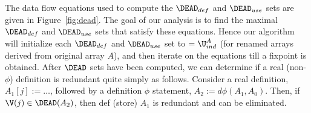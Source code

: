 The data flow equations used to compute the $\DEAD_{def}$ and $\DEAD_{use}$ sets are given in Figure~\ref{fig:dead}.
The goal of our analysis is to find the maximal $\DEAD_{def}$ and $\DEAD_{use}$ sets that satisfy these
equations.  Hence our algorithm will initialize each 
$\DEAD_{def}$ and $\DEAD_{use}$
set to
$= \U^A_{ind}$
(for renamed arrays derived from original array $A$),
and then iterate on the equations till a fixpoint
is obtained.
After $\DEAD$ sets have been computed, we can determine if a real (non-$\phi$)
definition is redundant quite simply as follows.
Consider a real definition, $A_1[j] := \ldots$, followed by a definition
$\phi$ statement, $A_2 := d\phi(A_1,A_0)$.
Then, if $\V(j) \in \DEAD(A_2)$, then def (store) $A_1$ is redundant and can
be eliminated.
